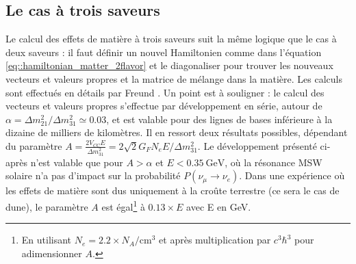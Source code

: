     \subsection{Le cas à trois saveurs}\label{sec::3flavor_matter}
      Le calcul des effets de matière à trois saveurs suit la même logique que le cas à deux saveurs : il faut définir un nouvel Hamiltonien comme dans l'équation \eqref{eq::hamiltonian_matter_2flavor} et le diagonaliser pour trouver les nouveaux vecteurs et valeurs propres et la matrice de mélange dans la matière. Les calculs sont effectués en détails par Freund \cite{Freund2001}. Un point est à souligner : le calcul des vecteurs et valeurs propres s'effectue par développement en série, autour de $\alpha=\Delta m^2_{21}/\Delta m^2_{31}\simeq0.03$, et est valable pour des lignes de bases inférieure à la dizaine de milliers de kilomètres. Il en ressort deux résultats possibles, dépendant du paramètre $A=\frac{2V_{CC}E}{\Delta m^2_{31}}=2\sqrt{2}G_F N_eE/\Delta m^2_{31}$.  Le développement présenté ci-après n'est valable que pour $A>\alpha$ et  $E<\SI{0.35}{\giga\electronvolt}$, où la résonance MSW solaire n'a pas d'impact sur la probabilité $P(\nu_{\mu}\to\nu_e)$\cite{Freund2001}. Dans une expérience où les effets de matière sont dus uniquement à la croûte terrestre (ce sera le cas de \gls{dune}), le paramètre $A$ est égal\footnote{En utilisant $N_e=2.2\times N_A\si{\per\centi\meter^3}$\cite{pdg2018} et après multiplication par $c^3\hbar^3$ pour adimensionner $A$.} à $0.13\times E$ avec E en \si{\giga\electronvolt}.

